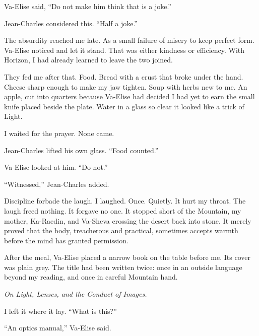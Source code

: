 Va-Elise said, ``Do not make him think that is a joke.''\par

Jean-Charles considered this. ``Half a joke.''\par

The absurdity reached me late. As a small failure of misery to keep perfect form. Va-Elise noticed and let it stand. That was either kindness or efficiency. With Horizon, I had already learned to leave the two joined.\par

They fed me after that. Food. Bread with a crust that broke under the hand. Cheese sharp enough to make my jaw tighten. Soup with herbs new to me. An apple, cut into quarters because Va-Elise had decided I had yet to earn the small knife placed beside the plate. Water in a glass so clear it looked like a trick of Light.\par

I waited for the prayer. None came.\par

Jean-Charles lifted his own glass. ``Food counted.''\par

Va-Elise looked at him. ``Do not.''\par

``Witnessed,'' Jean-Charles added.\par

Discipline forbade the laugh. I laughed. Once. Quietly. It hurt my throat. The laugh freed nothing. It forgave no one. It stopped short of the Mountain, my mother, Ka-Raedin, and Va-Sheva crossing the desert back into stone. It merely proved that the body, treacherous and practical, sometimes accepts warmth before the mind has granted permission.\par

After the meal, Va-Elise placed a narrow book on the table before me. Its cover was plain grey. The title had been written twice: once in an outside language beyond my reading, and once in careful Mountain hand.\par

\textit{On Light, Lenses, and the Conduct of Images.}\par

I left it where it lay. ``What is this?''\par

``An optics manual,'' Va-Elise said.\par

